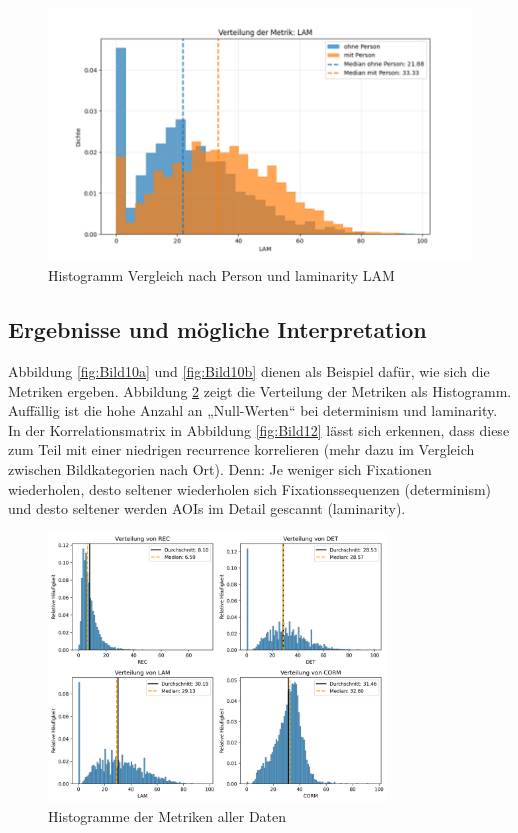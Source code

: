 \documentclass[
    language=german, %
    thesis=seminar, %
    supervisor=postdoc, %
    multiauthor=true, %
    ]{settings/csssa-thesis}
\begin{document}
\begin{figure}[h]
    \centering
    \includegraphics[width=\linewidth,height=0.8\textheight,keepaspectratio]{figures/Bild23.png}
    \caption{Histogramm Vergleich nach Person und laminarity LAM}\label{fig:bild19}
\end{figure}

\subsection{Ergebnisse und mögliche Interpretation}
Abbildung \ref{fig:Bild10a} und \ref{fig:Bild10b} dienen als Beispiel dafür, wie sich die Metriken ergeben. 
Abbildung \ref{fig:Bild11} zeigt die Verteilung der Metriken als Histogramm. Auffällig ist 
die hohe Anzahl an „Null-Werten“ bei determinism und laminarity. 
In der Korrelationsmatrix in Abbildung \ref{fig:Bild12} lässt sich erkennen, dass diese zum 
Teil mit einer niedrigen recurrence korrelieren (mehr dazu im Vergleich zwischen Bildkategorien nach Ort). 
Denn: Je weniger sich Fixationen wiederholen, desto seltener wiederholen sich 
Fixationssequenzen (determinism) und desto seltener werden AOIs im Detail gescannt (laminarity). 

\begin{figure}[ht]
    \centering
    \includegraphics[width=0.8\textwidth,height=0.8\textheight,keepaspectratio]{figures/Bild12.png}
    \caption{Histogramme der Metriken aller Daten}\label{fig:Bild11}
\end{figure}
\end{document}
